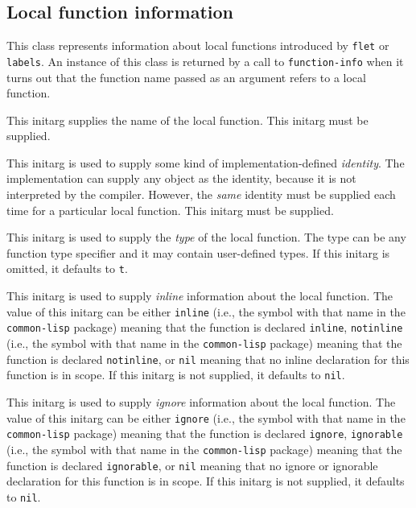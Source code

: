 \subsection{Local function information}


This class represents information about local functions introduced by
\texttt{flet} or \texttt{labels}.  An instance of this class is
returned by a call to \texttt{function-info} when it turns out that
the function name passed as an argument refers to a local function. 


This initarg supplies the name of the local function.  This initarg
must be supplied.


This initarg is used to supply some kind of implementation-defined 
\emph{identity}.  The implementation can supply any object as the
identity, because it is not interpreted by the compiler.  However, the
\emph{same} identity must be supplied each time for a particular
local function.  This initarg must be supplied. 


This initarg is used to supply the \emph{type} of the local function.
The type can be any function type specifier and it may contain
user-defined types.  If this initarg is omitted, it defaults to
\texttt{t}.


This initarg is used to supply \emph{inline} information about the
local function.  The value of this initarg can be either
\texttt{inline} (i.e., the symbol with that name in the
\texttt{common-lisp} package) meaning that the function is declared
\texttt{inline}, \texttt{notinline} (i.e., the symbol with that name
in the \texttt{common-lisp} package) meaning that the function is
declared \texttt{notinline}, or \texttt{nil} meaning that no inline
declaration for this function is in scope.  If this initarg is not
supplied, it defaults to \texttt{nil}.


This initarg is used to supply \emph{ignore} information about the
local function.  The value of this initarg can be either
\texttt{ignore} (i.e., the symbol with that name in the
\texttt{common-lisp} package) meaning that the function is declared
\texttt{ignore}, \texttt{ignorable} (i.e., the symbol with that name
in the \texttt{common-lisp} package) meaning that the function is
declared \texttt{ignorable}, or \texttt{nil} meaning that no ignore or
ignorable declaration for this function is in scope.  If this initarg
is not supplied, it defaults to \texttt{nil}.

